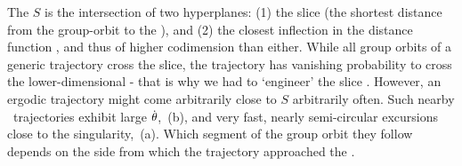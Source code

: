 \documentclass[preprint,12pt]{elsarticle} %
\begin{document}
The {\sset} $S$ is the intersection of two hyperplanes: (1) the slice
(the shortest distance from the group-orbit to the {\template}), and (2) the
closest inflection in the distance function , and thus
of higher codimension than either. While all group orbits of a  generic
trajectory cross the slice, the trajectory has vanishing probability to
cross the lower-dimensional {\sset} - that is why we had to `engineer'
the slice . However, an ergodic trajectory  might come
arbitrarily close to  $S$ arbitrarily often.
Such nearby \reducedsp\ trajectories exhibit large {\angVels} $\dot{{\bf \theta}}$,
\,(b), and very fast, nearly semi-circular
excursions close to the singularity, \,(a). Which segment
of the group orbit they follow depends on the side from which the
trajectory approached the {\sset}.
\end{document}

